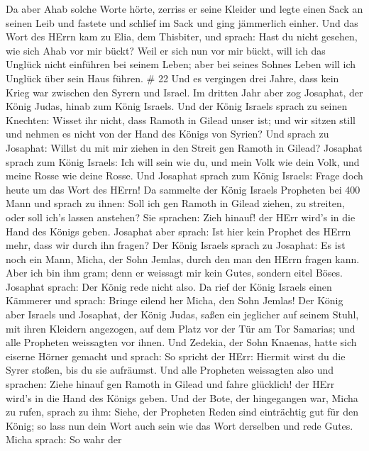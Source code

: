  Da aber Ahab solche Worte hörte, zerriss er seine Kleider
und legte einen Sack an seinen Leib und fastete und schlief im Sack und
ging jämmerlich einher.  Und das Wort des HErrn kam zu
Elia, dem Thisbiter, und sprach:  Hast du nicht gesehen,
wie sich Ahab vor mir bückt? Weil er sich nun vor mir bückt, will ich
das Unglück nicht einführen bei seinem Leben; aber bei seines Sohnes
Leben will ich Unglück über sein Haus führen. \# 22  Und es
vergingen drei Jahre, dass kein Krieg war zwischen den Syrern und
Israel.  Im dritten Jahr aber zog Josaphat, der König Judas,
hinab zum König Israels.  Und der König Israels sprach zu
seinen Knechten: Wisset ihr nicht, dass Ramoth in Gilead unser ist; und
wir sitzen still und nehmen es nicht von der Hand des Königs von Syrien?
 Und sprach zu Josaphat: Willst du mit mir ziehen in den
Streit gen Ramoth in Gilead? Josaphat sprach zum König Israels: Ich will
sein wie du, und mein Volk wie dein Volk, und meine Rosse wie deine
Rosse.  Und Josaphat sprach zum König Israels: Frage doch
heute um das Wort des HErrn!  Da sammelte der König Israels
Propheten bei 400 Mann und sprach zu ihnen: Soll ich gen Ramoth in
Gilead ziehen, zu streiten, oder soll ich's lassen anstehen? Sie
sprachen: Zieh hinauf! der HErr wird's in die Hand des Königs geben.
 Josaphat aber sprach: Ist hier kein Prophet des HErrn mehr,
dass wir durch ihn fragen?  Der König Israels sprach zu
Josaphat: Es ist noch ein Mann, Micha, der Sohn Jemlas, durch den man
den HErrn fragen kann. Aber ich bin ihm gram; denn er weissagt mir kein
Gutes, sondern eitel Böses. Josaphat sprach: Der König rede nicht also.
 Da rief der König Israels einen Kämmerer und sprach: Bringe
eilend her Micha, den Sohn Jemlas!  Der König aber Israels
und Josaphat, der König Judas, saßen ein jeglicher auf seinem Stuhl, mit
ihren Kleidern angezogen, auf dem Platz vor der Tür am Tor Samarias; und
alle Propheten weissagten vor ihnen.  Und Zedekia, der Sohn
Knaenas, hatte sich eiserne Hörner gemacht und sprach: So spricht der
HErr: Hiermit wirst du die Syrer stoßen, bis du sie aufräumst.
 Und alle Propheten weissagten also und sprachen: Ziehe
hinauf gen Ramoth in Gilead und fahre glücklich! der HErr wird's in die
Hand des Königs geben.  Und der Bote, der hingegangen war,
Micha zu rufen, sprach zu ihm: Siehe, der Propheten Reden sind
einträchtig gut für den König; so lass nun dein Wort auch sein wie das
Wort derselben und rede Gutes.  Micha sprach: So wahr der
